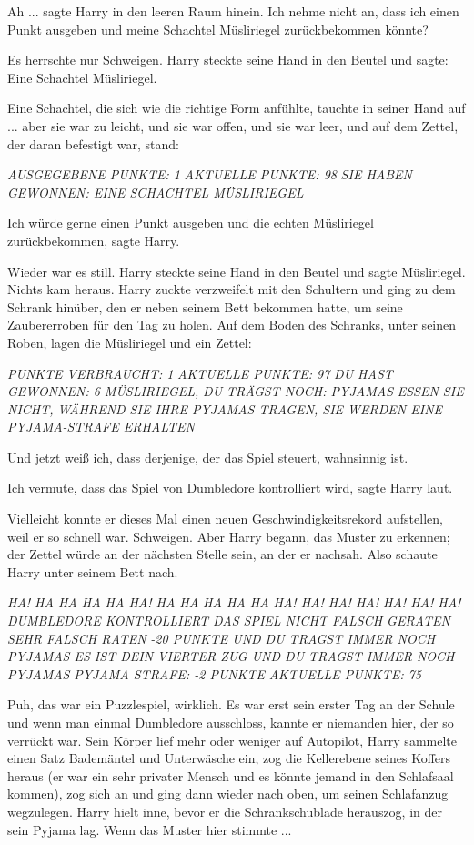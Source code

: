 \glqq{}Ah ...\grqq{} sagte Harry in den leeren Raum hinein. \glqq{}Ich nehme nicht
an, dass ich einen Punkt ausgeben und meine Schachtel Müsliriegel zurückbekommen
könnte?\grqq{}

Es herrschte nur Schweigen. Harry steckte seine Hand in den Beutel und sagte:
\glqq{}Eine Schachtel Müsliriegel.\grqq{}

Eine Schachtel, die sich wie die richtige Form anfühlte, tauchte in seiner Hand
auf ... aber sie war zu leicht, und sie war offen, und sie war leer, und auf dem
Zettel, der daran befestigt war, stand:

\emph{AUSGEGEBENE PUNKTE: 1} \emph{AKTUELLE PUNKTE: 98} \emph{SIE HABEN
GEWONNEN: EINE SCHACHTEL MÜSLIRIEGEL}

\glqq{}Ich würde gerne einen Punkt ausgeben und die echten Müsliriegel
zurückbekommen\grqq{}, sagte Harry.

Wieder war es still. Harry steckte seine Hand in den Beutel und sagte \glqq{}
Müsliriegel\grqq{}. Nichts kam heraus. Harry zuckte verzweifelt mit den
Schultern und ging zu dem Schrank hinüber, den er neben seinem Bett bekommen
hatte, um seine Zaubererroben für den Tag zu holen. Auf dem Boden des Schranks,
unter seinen Roben, lagen die Müsliriegel und ein Zettel:

\emph{PUNKTE VERBRAUCHT: 1} \emph{AKTUELLE PUNKTE: 97} \emph{DU HAST GEWONNEN:
6 MÜSLIRIEGEL,} \emph{DU TRÄGST NOCH: PYJAMAS} \emph{ESSEN SIE NICHT, WÄHREND
SIE IHRE PYJAMAS TRAGEN, SIE WERDEN EINE PYJAMA-STRAFE ERHALTEN}

Und jetzt weiß ich, dass derjenige, der das Spiel steuert, wahnsinnig ist.

\glqq{}Ich vermute, dass das Spiel von Dumbledore kontrolliert wird\grqq{}, sagte
Harry laut.

Vielleicht konnte er dieses Mal einen neuen Geschwindigkeitsrekord aufstellen,
weil er so schnell war. Schweigen. Aber Harry begann, das Muster zu erkennen;
der Zettel würde an der nächsten Stelle sein, an der er nachsah. Also schaute
Harry unter seinem Bett nach.

\emph{HA! HA HA HA HA HA! HA HA HA HA HA HA! HA! HA! HA! HA! HA! HA! DUMBLEDORE
KONTROLLIERT DAS SPIEL NICHT FALSCH GERATEN SEHR FALSCH RATEN} \emph{-20 PUNKTE
UND DU TRAGST IMMER NOCH PYJAMAS ES IST DEIN VIERTER ZUG UND DU TRAGST IMMER
NOCH PYJAMAS} \emph{PYJAMA STRAFE: -2 PUNKTE} \emph{AKTUELLE PUNKTE: 75}

Puh, das war ein Puzzlespiel, wirklich. Es war erst sein erster Tag an der
Schule und wenn man einmal Dumbledore ausschloss, kannte er niemanden hier, der
so verrückt war. Sein Körper lief mehr oder weniger auf Autopilot, Harry
sammelte einen Satz Bademäntel und Unterwäsche ein, zog die Kellerebene seines
Koffers heraus (er war ein sehr privater Mensch und es könnte jemand in den
Schlafsaal kommen), zog sich an und ging dann wieder nach oben, um seinen
Schlafanzug wegzulegen. Harry hielt inne, bevor er die Schrankschublade
herauszog, in der sein Pyjama lag. Wenn das Muster hier stimmte ...

